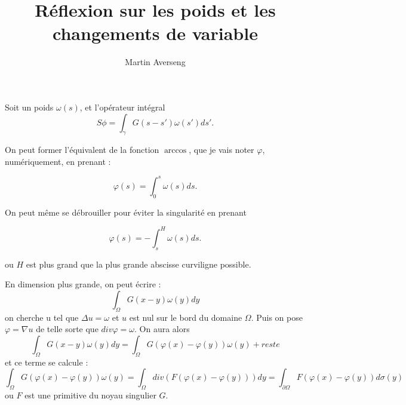\documentclass[]{article}
\title{Réflexion sur les poids et les changements de variable}
\author{Martin Averseng}
\begin{document}
	\maketitle
	
	Soit un poids $\omega(s)$, et l'opérateur intégral 
	\[S\phi = \int_{\gamma} G(s - s') \omega(s')ds'.\]
	
	On peut former l'équivalent de la fonction $\arccos$, que je vais noter $\varphi$, numériquement, en prenant : 
	
	\[\varphi(s) = \int_{0}^{s} \omega(s) ds.\]
	
	On peut même se débrouiller pour éviter la singularité en prenant 
	
	\[\varphi(s) = -\int_{s}^{H} \omega(s) ds.\]
	
	ou $H$ est plus grand que la plus grande abscisse curviligne possible.
	
	En dimension plus grande, on peut écrire : 
	\[ \int_{\Omega} G(x - y) \omega(y) dy\]
	on cherche u tel que $\Delta u = \omega$ et $u$ est nul sur le bord du domaine $\Omega$. Puis on pose $\varphi = \nabla u$ de telle sorte que $div \varphi = \omega$. On aura alors 
	\[\int_{\Omega} G(x - y) \omega(y) dy = \int_{\Omega} G(\varphi(x) - \varphi(y)) \omega(y) + reste\]
	et ce terme se calcule :
	\[\int_{\Omega} G(\varphi(x) - \varphi(y)) \omega(y) = \int_{\Omega} div (F(\varphi(x) - \varphi(y))) dy = \int_{\partial \Omega} F(\varphi(x) - \varphi(y))d\sigma(y)\]
	ou $F$ est une primitive du noyau singulier $G$. 
	
\end{document}
